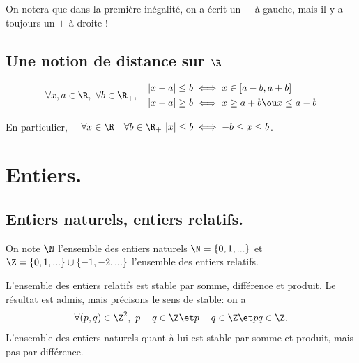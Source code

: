 \documentclass[11pt]{article}
\begin{document}
\warning On notera que dans la première inégalité, on a écrit un $-$ à gauche, mais il y a toujours un $+$ à droite !

\subsection{Une notion de distance sur \texorpdfstring{$\R$}{Lg}}

\begin{center}
\end{center}

\begin{prop}{}{}
    \begin{equation*}
        \forall x,a\in\R,~\forall b\in\R_+,\quad\begin{aligned}
            |x-a|\leq b &\iff x\in[a-b,a+b]\\
            |x-a|\geq b &\iff x\geq a+b \ou x\leq a-b
        \end{aligned}
    \end{equation*}
    \begin{center}
        En particulier, $\quad\forall x\in \R\quad\forall b\in\R_+~|x|\leq b\iff -b\leq x \leq b$.
    \end{center}
\end{prop}

\section{Entiers.}

\subsection{Entiers naturels, entiers relatifs.}

\begin{defi}{}{}
    On note $\N$ l'ensemble des entiers naturels $\N=\{0,1,...\}$ et $\Z=\{0,1,...\}\cup\{-1,-2,...\}$ l'ensemble des entiers relatifs.
\end{defi}

\begin{prop}{}{}
    L'ensemble des entiers relatifs est stable par somme, différence et produit.
    \tcblower
    Le résultat est admis, mais précisons le sens de stable: on a
    \begin{equation*}
        \forall (p,q)\in\Z^2,~p+q\in\Z\et p-q\in\Z\et pq\in\Z.
    \end{equation*}
    L'ensemble des entiers naturels quant à lui est stable par somme et produit, mais pas par différence.
\end{prop}
\end{document}
